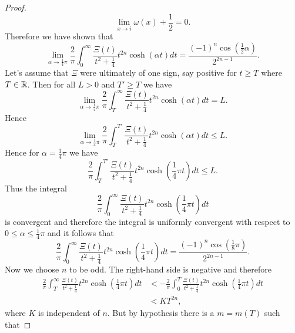 \begin{proof}
\begin{equation*}
	\lim _{x \to i} \omega(x) + \frac{1}{2} = 0.
\end{equation*}
	Therefore we have shown that
\begin{equation*}
	\lim _{\alpha \to \frac{1}{4} \pi} \frac{2}{\pi} \int _0 ^{\infty} \frac{\Xi(t)}{t^2 + \frac{1}{4}} t^{2n} \cosh(\alpha t) dt = \frac{(-1)^{n} \cos(\frac{1}{2} \alpha)}{2^{2n - 1}}.
\end{equation*}
	Let's assume that $\Xi$ were ultimately of one sign, say positive for $t \geq T$ where $T \in \mathbb{R}$. Then for all $L > 0$ and $T' \geq T$ we have
\begin{equation*}
	\lim _{\alpha \to \frac{1}{4} \pi} \frac{2}{\pi} \int _T ^{\infty} \frac{\Xi(t)}{t^2 + \frac{1}{4}} t^{2n} \cosh(\alpha t) dt = L.
\end{equation*}
	Hence
\begin{equation*}
	\lim _{\alpha \to \frac{1}{4} \pi} \frac{2}{\pi} \int _T ^{T'} \frac{\Xi(t)}{t^2 + \frac{1}{4}} t^{2n} \cosh(\alpha t) dt \leq L.
\end{equation*}
	Hence for $\alpha = \frac{1}{4}\pi$ we have
\begin{equation*}
	\frac{2}{\pi} \int _T ^{T'} \frac{\Xi(t)}{t^2 + \frac{1}{4}} t^{2n} \cosh(\frac{1}{4}\pi t) dt \leq L.
\end{equation*}
	Thus the integral
\begin{equation*}
	\frac{2}{\pi} \int _0 ^{\infty} \frac{\Xi(t)}{t^2 + \frac{1}{4}} t^{2n} \cosh(\frac{1}{4}\pi t) dt
\end{equation*}
	is convergent and therefore the integral is uniformly convergent with respect to $0 \leq \alpha \leq \frac{1}{4}\pi$ and it follows that
\begin{equation*}
	\frac{2}{\pi} \int _0 ^{\infty} \frac{\Xi(t)}{t^2 + \frac{1}{4}} t^{2n} \cosh(\frac{1}{4} \pi t) dt = \frac{(-1)^{n} \cos(\frac{1}{8} \pi)}{2^{2n - 1}}.
\end{equation*}
	Now we choose $n$ to be odd. The right-hand side is negative and therefore
\begin{equation*}
\begin{aligned}
	\frac{2}{\pi} \int _T ^{\infty} \frac{\Xi(t)}{t^2 + \frac{1}{4}} t^{2n} \cosh(\frac{1}{4} \pi t) dt 
		&< - \frac{2}{\pi} \int _0 ^{T} \frac{\Xi(t)}{t^2 + \frac{1}{4}} t^{2n} \cosh(\frac{1}{4} \pi t) dt \\
		&< KT^{2n},
\end{aligned}
\end{equation*}
	where $K$ is independent of $n$. But by hypothesis there is a $m = m(T)$ such that

\end{proof}
